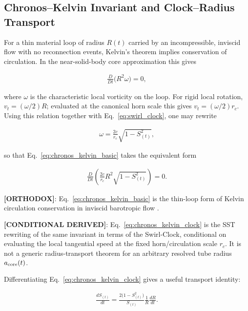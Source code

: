 \documentclass[11pt]{article}
\theoremstyle{definition}
\theoremstyle{plain}
\theoremstyle{remark}
\newcommand{\rc}{{r_c}}
\begin{document}
    \subsection{Chronos--Kelvin Invariant and Clock--Radius Transport}
        \label{subsec:chronos_kelvin}

        For a thin material loop of radius $R(t)$ carried by an incompressible, inviscid flow with no reconnection events, Kelvin's theorem implies conservation of circulation. In the near-solid-body core approximation this gives

        \begin{align}
            \frac{D}{Dt}\!\bigl(R^2 \omega\bigr) = 0,
            \label{eq:chronos_kelvin_basic}
        \end{align}

        where $\omega$ is the characteristic local vorticity on the loop. For rigid local rotation, $v_t=(\omega/2)R$; evaluated at the canonical horn scale this gives $v_t=(\omega/2)\rc$. Using this relation together with Eq.~\eqref{eq:swirl_clock}, one may rewrite

        \begin{align}
            \omega = \frac{2c}{\rc}\sqrt{1-S_{(t)}^2},
        \end{align}

        so that Eq.~\eqref{eq:chronos_kelvin_basic} takes the equivalent form

        \begin{align}
            \frac{D}{Dt}\left(\frac{2c}{\rc} R^2 \sqrt{1-S_{(t)}^2}\right) = 0.
            \label{eq:chronos_kelvin_clock}
        \end{align}

        \textbf{[ORTHODOX]}: Eq.~\eqref{eq:chronos_kelvin_basic} is the thin-loop form of Kelvin circulation conservation in inviscid barotropic flow \cite{Batchelor1967,Saffman1992}.

        \textbf{[CONDITIONAL DERIVED]}: Eq.~\eqref{eq:chronos_kelvin_clock} is the SST rewriting of the same invariant in terms of the Swirl-Clock, conditional on evaluating the local tangential speed at the fixed horn/circulation scale $\rc$. It is not a generic radius-transport theorem for an arbitrary resolved tube radius $a_{\rm core}(t)$.

        Differentiating Eq.~\eqref{eq:chronos_kelvin_clock} gives a useful transport identity:

        \begin{align}
            \frac{dS_{(t)}}{dt}
            =
            \frac{2\bigl(1-S_{(t)}^2\bigr)}{S_{(t)}}
            \frac{1}{R}\frac{dR}{dt}.
            \label{eq:clock_radius_transport}
        \end{align}
\end{document}
